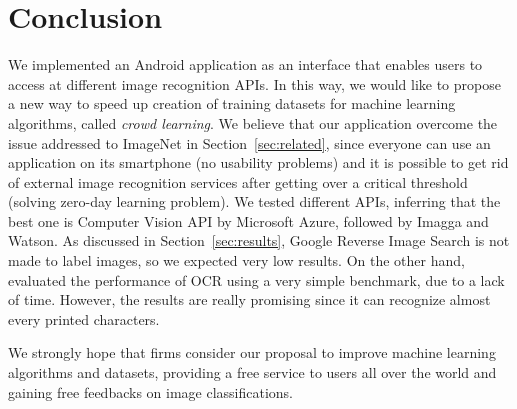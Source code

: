 \section{Conclusion}
\label{sec:conclusion}

We implemented an Android application as an interface that enables users to 
access at different image recognition APIs. In this way, we would like to 
propose a new way to speed up creation of training  datasets for machine 
learning algorithms, called \textit{crowd learning}. We believe that our 
application overcome the issue addressed to ImageNet in 
Section~\ref{sec:related}, since everyone can use an application on its 
smartphone (no usability problems) and it is possible to get rid of external 
image recognition services after getting over a critical threshold (solving 
zero-day learning problem).
We tested different APIs, inferring that the best one is Computer Vision API by 
Microsoft Azure\cite{Microsoft}, followed by Imagga\cite{Imagga} and 
Watson\cite{IBM}. As discussed in Section~\ref{sec:results}, Google Reverse 
Image Search\cite{Google} is not made to label images, so we expected very low 
results. On the other hand, evaluated the performance of OCR using a very simple 
benchmark, due to a lack of time. However, the results are really promising 
since it can recognize almost every printed characters.

We strongly hope that firms consider our proposal to improve machine learning 
algorithms and datasets, providing a free service to users all over the world 
and gaining free feedbacks on image classifications.
